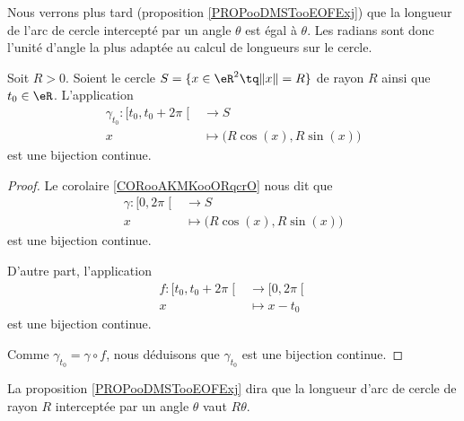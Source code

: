 Nous verrons plus tard (proposition \ref{PROPooDMSTooEOFExj}) que la longueur de l'arc de cercle intercepté par un angle $\theta$ est égal à $\theta$. Les radians sont donc l'unité d'angle la plus adaptée au calcul de longueurs sur le cercle.

\begin{lemma}       \label{LEMooXISFooRMWUEC}
	Soit \( R>0\). Soient le cercle \( S=\{ x\in \eR^2\tq \| x \|=R \}\) de rayon \( R\) ainsi que \( t_0\in \eR\). L'application
	\begin{equation}
		\begin{aligned}
			\gamma_{t_0}\colon \mathopen[ t_0 , t_0+2\pi \mathclose[ & \to S                                 \\
			x                                                        & \mapsto \big( R\cos(x),R\sin(x) \big)
		\end{aligned}
	\end{equation}
	est une bijection continue.
\end{lemma}

\begin{proof}
	Le corolaire \ref{CORooAKMKooORqcrO} nous dit que
	\begin{equation}
		\begin{aligned}
			\gamma\colon \mathopen[ 0 , 2\pi \mathclose[ & \to S                                 \\
			x                                            & \mapsto \big( R\cos(x),R\sin(x) \big)
		\end{aligned}
	\end{equation}
	est une bijection continue.

	D'autre part, l'application
	\begin{equation}
		\begin{aligned}
			f\colon \mathopen[ t_0 , t_0+2\pi \mathclose[ & \to \mathopen[ 0 , 2\pi \mathclose[ \\
			x                                             & \mapsto x-t_0
		\end{aligned}
	\end{equation}
	est une bijection continue.

	Comme \( \gamma_{t_0}=\gamma\circ f\), nous déduisons que \( \gamma_{t_0}\) est une bijection continue.
\end{proof}

\begin{normaltext}
    La proposition \ref{PROPooDMSTooEOFExj} dira que la longueur d'arc de cercle de rayon \( R\) interceptée par un angle \( \theta\) vaut \( R\theta\).
\end{normaltext}

